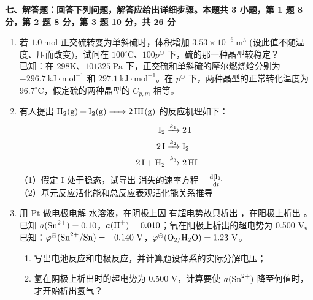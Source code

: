 \vspace{0.5cm}
\noindent\textbf{七、解答题：回答下列问题，解答应给出详细步骤。本题共 3 小题，第 1 题 8 分，第 2 题 8 分，第 3 题 10 分，共 26 分}

\begin{enumerate}[label=\arabic*., itemsep=1.5ex]
    \item 若 $1.0\ \text{mol}$ 正交硫转变为单斜硫时，体积增加 $3.53 \times 10^{-6}\ \text{m}^3$ (设此值不随温度、压而改变)，试问在 $100^{\circ}\text{C}$、$100p^\ominus$ 下，硫的那一种晶型较稳定？\\
    已知：在 298K、$101325\ \text{Pa}$ 下，正交硫和单斜硫的摩尔燃烧焓分别为 $-296.7\ \text{kJ}\cdot\text{mol}^{-1}$ 和 $297.1\ \text{kJ}\cdot\text{mol}^{-1}$。在 $p^\ominus$ 下，两种晶型的正常转化温度为 $96.7^{\circ}\text{C}$，假定硫的两种晶型的 $C_{p,m}$ 相等。
    
    \item 有人提出 $\ce{H2(g) + I2(g) -> 2HI(g)}$ 的反应机理如下：
    \begin{align*}
        \ce{I2} &\xrightarrow{k_1} \ce{2I} \\
        \ce{2I} &\xrightarrow{k_2} \ce{I2} \\
        \ce{2I + H2} &\xrightarrow{k_3} \ce{2HI}
    \end{align*}
    （1）假定 I 处于稳态，试导出  消失的速率方程 $-\frac{\mathrm{d}[\ce{I2}]}{\mathrm{d}t}$ \\
    （2）基元反应活化能和总反应表观活化能关系推导
    
    \item 用 Pt 做电极电解  水溶液，在阴极上因  有超电势故只析出 ，在阳极上析出 。已知 $a(\ce{Sn^{2+}})=0.10$，$a(\ce{H+})=0.010$；氧在阳极上析出的超电势为 0.500 V。\\
    已知：$\varphi^\ominus(\ce{Sn^{2+}/Sn}) = -0.140\ \text{V}$，$\varphi^\ominus(\ce{O2/H2O}) = 1.23\ \text{V}$。
    \begin{enumerate}[label=（\arabic*）]
        \item 写出电池反应和电极反应，并计算题设体系的实际分解电压；
        \item 氢在阴极上析出时的超电势为 0.500 V，计算要使 $a(\ce{Sn^{2+}})$ 降至何值时，才开始析出氢气？
    \end{enumerate}
\end{enumerate}